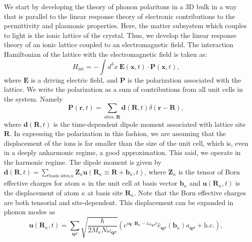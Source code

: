 \documentclass[aps,prb,twocolumn,
	groupedaddress,superscriptaddress,
	amsfonts,amssymb,amsmath,floatfix,
	citeautoscript]{revtex4-1}
\begin{document}
We start by developing the theory of phonon polaritons in a 3D bulk in a way that is parallel to the linear response theory of electronic contributions to the permittivity and plasmonic properties. Here, the matter subsystem which couples to light is the ionic lattice of the crystal. Thus, we develop the linear response theory of an ionic lattice coupled to an electromagnetic field. The interaction Hamiltonian of the lattice with the electromagnetic field is taken as:
\begin{equation}\label{eq:interaction}
H_{\text{int}} = -\int d^3x ~\mathbf{E}(\mathbf{x},t)\cdot\mathbf{P}(\mathbf{x},t),
\end{equation}
where $\mathbf{E}$ is a driving electric field, and $\mathbf{P}$ is the polarization associated with the lattice. We write the polarization as a sum of contributions from all unit cells in the system. Namely
\begin{equation}\label{eq:dipolesum}
\mathbf{P}(\mathbf{r},t) = \sum\limits_{\text{sites, }\mathbf{R}}\mathbf{d}(\mathbf{R},t)\delta(\mathbf{r}-\mathbf{R}),
\end{equation}
where $\mathbf{d}(\mathbf{R},t)$ is the time-dependent dipole moment associated with lattice site $\mathbf{R}$. In expressing the polarization in this fashion, we are assuming that the displacement of the ions is far smaller than the size of the unit cell, which is, even in a deeply anharmonic regime, a good approximation. This said, we operate in the harmonic regime.  The dipole moment is given by $\mathbf{d}(\mathbf{R},t) = \sum\limits_{\text{basis sites,}\kappa}  \mathbf{Z}_{\kappa}\mathbf{u}(\mathbf{R}_{\kappa} \equiv \mathbf{R}+\mathbf{b}_{\kappa},t)$, where $\mathbf{Z}_{\kappa}$ is the tensor of Born effective charges for atom $\kappa$ in the unit cell at basis vector $\mathbf{b}_{\kappa}$ and $\mathbf{u}(\mathbf{R}_{\kappa},t)$ is the displacement of atom $\kappa$ at basis site $\mathbf{R}_{\kappa}$. Note that the Born effective charges are both tensorial and site-dependent.  This displacement can be expanded in phonon modes as
\begin{equation}\label{eq:phononfield}
\mathbf{u}(\mathbf{R}_{\kappa},t) = \sum\limits_{\mathbf{q}\sigma}\sqrt{\frac{\hbar}{2M_{\kappa}N\omega_{\mathbf{q}\sigma}}}\left( e^{i\mathbf{q}\cdot\mathbf{R}_{\kappa}-i\omega_{\mathbf{q}\sigma}t}\hat{e}_{\mathbf{q}\sigma}(\mathbf{b}_{\kappa})a_{\mathbf{q}\sigma} + \text{h.c.} \right),
\end{equation}
\end{document}
